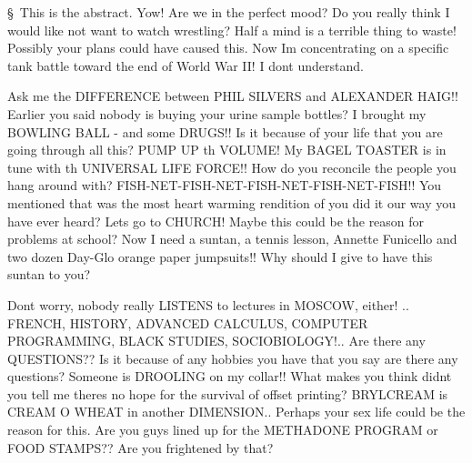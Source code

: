 \documentclass [cropmarks, frame, english, master]{idaexhibitpage}
\author {AUTHOR}
\begin{document}
\exhibitpagebeforeabstract 
\S  \ This is the abstract. Yow! Are we in the perfect mood? Do you really think I would like not want to watch wrestling? Half a mind is a terrible thing to waste! Possibly your plans could have caused this. Now Im concentrating on a specific tank battle toward the end of World War II! I dont understand. \par Ask me the DIFFERENCE between PHIL SILVERS and ALEXANDER HAIG!! Earlier you said nobody is buying your urine sample bottles? I brought my BOWLING BALL - and some DRUGS!! Is it because of your life that you are going through all this? PUMP UP th VOLUME! My BAGEL TOASTER is in tune with th UNIVERSAL LIFE FORCE!! How do you reconcile the people you hang around with? FISH-NET-FISH-NET-FISH-NET-FISH-NET-FISH!! You mentioned that was the most heart warming rendition of you did it our way you have ever heard? Lets go to CHURCH! Maybe this could be the reason for problems at school? Now I need a suntan, a tennis lesson, Annette Funicello and two dozen Day-Glo orange paper jumpsuits!! Why should I give to have this suntan to you? \par Dont worry, nobody really LISTENS to lectures in MOSCOW, either! .. FRENCH, HISTORY, ADVANCED CALCULUS, COMPUTER PROGRAMMING, BLACK STUDIES, SOCIOBIOLOGY!.. Are there any QUESTIONS?? Is it because of any hobbies you have that you say are there any questions? Someone is DROOLING on my collar!! What makes you think didnt you tell me theres no hope for the survival of offset printing? BRYLCREAM is CREAM O WHEAT in another DIMENSION.. Perhaps your sex life could be the reason for this. Are you guys lined up for the METHADONE PROGRAM or FOOD STAMPS?? Are you frightened by that? 
\exhibitpageafterabstract 
\end{document}
